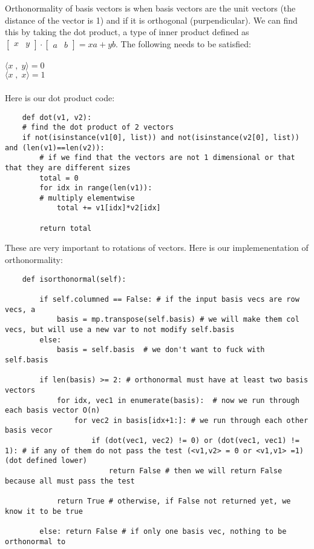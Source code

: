 \documentclass[12pt, a4paper]{article}
\begin{document}
Orthonormality of basis vectors is when basis vectors are the unit vectors (the distance of the vector is 1) and if it is orthogonal (purpendicular).
We can find this by taking the dot product, a type of inner product defined as $\begin{bmatrix} x & y \end{bmatrix}  \cdot  \begin{bmatrix} a & b \end{bmatrix} = xa + yb$. 
The following needs to be satisfied: \\
\\
            $\langle x \; , \; y \rangle = 0$
            \\
            $\langle x \; , \; x \rangle = 1$
\\
\\
Here is our dot product code:
\begin{lstlisting}
    def dot(v1, v2):
    # find the dot product of 2 vectors
    if not(isinstance(v1[0], list)) and not(isinstance(v2[0], list)) and (len(v1)==len(v2)):
        # if we find that the vectors are not 1 dimensional or that that they are different sizes
        total = 0
        for idx in range(len(v1)):
        # multiply elementwise
            total += v1[idx]*v2[idx]
        
        return total
\end{lstlisting}

These are very important to rotations of vectors. 
Here is our implemenentation of orthonormality:
\begin{lstlisting}
    def isorthonormal(self): 

        if self.columned == False: # if the input basis vecs are row vecs, a
            basis = mp.transpose(self.basis) # we will make them col vecs, but will use a new var to not modify self.basis
        else:
            basis = self.basis  # we don't want to fuck with self.basis

        if len(basis) >= 2: # orthonormal must have at least two basis vectors
            for idx, vec1 in enumerate(basis):  # now we run through each basis vector O(n)
                for vec2 in basis[idx+1:]: # we run through each other basis vecor
                    if (dot(vec1, vec2) != 0) or (dot(vec1, vec1) != 1): # if any of them do not pass the test (<v1,v2> = 0 or <v1,v1> =1) (dot defined lower)
                        return False # then we will return False because all must pass the test
                
            return True # otherwise, if False not returned yet, we know it to be true
        
        else: return False # if only one basis vec, nothing to be orthonormal to
\end{lstlisting}
\end{document}
